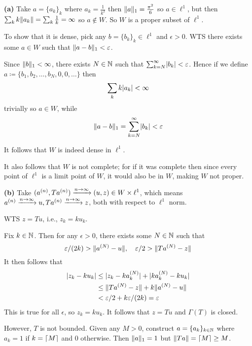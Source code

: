 \documentclass[a4paper, 10pt]{article}
\begin{document}
\begin{solution}
    \textbf{(a)} Take $a = \{a_k\}_k$ where $a_k = \frac{1}{k^2}$ then $\lVert a\rVert_1 = \frac{\pi^2}{6}$ so $a \in \ell^1$, but then $\sum_{k} k \lVert a_k\rVert = \sum_{k} \frac{1}{k} = \infty$ so $a \not \in W$. So $W$ is a proper subset of $\ell^1$.

    To show that it is dense, pick any $b = \{b_k\}_k \in\ell^1$ and $\epsilon > 0$. WTS there exists some $a \in W$ such that $\lVert a - b\rVert_1 < \varepsilon$.

    Since $\lVert b\rVert_1 < \infty$, there exists $N \in \mathbb{N}$ such that $\sum_{k = N}^{\infty} \lvert b_k\rvert < \varepsilon$. Hence if we define $a \coloneqq \{b_1, b_2, \ldots, b_N, 0, 0, \ldots\}$ then \begin{equation*}
    \sum_{k} k \lvert a_k\rvert < \infty
    \end{equation*}
     trivially so $a \in W$, while \begin{equation*}
     \lVert a - b\rVert_1 = \sum_{k=N}^{\infty} \lvert b_k\rvert < \varepsilon
    \end{equation*}
    
    It follows that $W$ is indeed dense in $\ell^1$.

    It also follows that $W$ is not complete; for if it was complete then since every point of $\ell^1$ is a limit point of $W$, it would also be in $W$, making $W$ not proper.

    \textbf{(b)} Take $(a^{(n)}, Ta^{(n)}) \xrightarrow{n \to \infty} (u, z) \in W \times \ell^1$, which means $a^{(n)} \xrightarrow{n \to \infty} u, Ta^{(n)} \xrightarrow{n \to \infty} z$, both with respect to $\ell^1$ norm.
    
    WTS $z = Tu$, i.e., $z_k = ku_k$.

    Fix $k \in \mathbb{N}$. Then for any $\epsilon > 0$, there exists some $N \in \mathbb{N}$ such that \begin{equation*}
    \varepsilon/(2k) > \lVert a^{(N)} - u\rVert, \quad \varepsilon/2 > \lVert Ta^{(N)} - z\rVert
    \end{equation*}
    It then follows that \begin{align*}
        \lvert z_k - ku_k\rvert &\leq \lvert z_k - ka^{(N)}_k\rvert + \lvert ka^{(N)}_k - ku_k\rvert \\
        &\leq \lVert Ta^{(N)} - z\rVert + k \lVert a^{(N)} - u\rVert \\
        &< \varepsilon/2 + k\varepsilon/(2k) = \varepsilon
    \end{align*}
    This is true for all $\epsilon$, so $z_k = ku_k$. It follows that $z = Tu$ and $\Gamma(T)$ is closed.

    However, $T$ is not bounded. Given any $M > 0$, construct $a = \{a_k\}_{k \in\mathbb{N}}$ where $a_k = 1$ if $k = \lceil M\rceil$ and $0$ otherwise. Then $\lVert a\rVert_1 = 1$ but $\lVert Ta\rVert = \lceil M\rceil \geq M$.


\end{solution}
\end{document}
